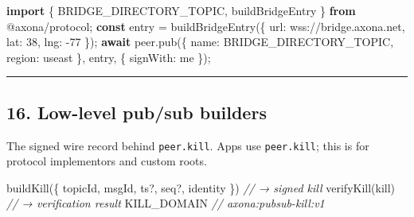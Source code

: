 \documentclass[
  nobib]{tufte-handout}
\newenvironment{Shaded}{}{}
\newcommand{\CommentTok}[1]{\textcolor[rgb]{0.38,0.63,0.69}{\textit{#1}}}
\newcommand{\ControlFlowTok}[1]{\textcolor[rgb]{0.00,0.44,0.13}{\textbf{#1}}}
\newcommand{\DataTypeTok}[1]{\textcolor[rgb]{0.56,0.13,0.00}{#1}}
\newcommand{\DecValTok}[1]{\textcolor[rgb]{0.25,0.63,0.44}{#1}}
\newcommand{\FunctionTok}[1]{\textcolor[rgb]{0.02,0.16,0.49}{#1}}
\newcommand{\ImportTok}[1]{\textcolor[rgb]{0.00,0.50,0.00}{\textbf{#1}}}
\newcommand{\KeywordTok}[1]{\textcolor[rgb]{0.00,0.44,0.13}{\textbf{#1}}}
\newcommand{\NormalTok}[1]{#1}
\newcommand{\OperatorTok}[1]{\textcolor[rgb]{0.40,0.40,0.40}{#1}}
\newcommand{\StringTok}[1]{\textcolor[rgb]{0.25,0.44,0.63}{#1}}
\begin{document}
\begin{Shaded}
\begin{Highlighting}[]
\ImportTok{import}\NormalTok{ \{ BRIDGE\_DIRECTORY\_TOPIC}\OperatorTok{,}\NormalTok{ buildBridgeEntry \} }\ImportTok{from} \StringTok{\textquotesingle{}@axona/protocol\textquotesingle{}}\OperatorTok{;}
\KeywordTok{const}\NormalTok{ entry }\OperatorTok{=} \FunctionTok{buildBridgeEntry}\NormalTok{(\{ }\DataTypeTok{url}\OperatorTok{:} \StringTok{\textquotesingle{}wss://bridge.axona.net\textquotesingle{}}\OperatorTok{,} \DataTypeTok{lat}\OperatorTok{:} \DecValTok{38}\OperatorTok{,} \DataTypeTok{lng}\OperatorTok{:} \OperatorTok{{-}}\DecValTok{77}\NormalTok{ \})}\OperatorTok{;}
\ControlFlowTok{await}\NormalTok{ peer}\OperatorTok{.}\FunctionTok{pub}\NormalTok{(\{ }\DataTypeTok{name}\OperatorTok{:}\NormalTok{ BRIDGE\_DIRECTORY\_TOPIC}\OperatorTok{,} \DataTypeTok{region}\OperatorTok{:} \StringTok{\textquotesingle{}useast\textquotesingle{}}\NormalTok{ \}}\OperatorTok{,}\NormalTok{ entry}\OperatorTok{,}\NormalTok{ \{ }\DataTypeTok{signWith}\OperatorTok{:}\NormalTok{ me \})}\OperatorTok{;}
\end{Highlighting}
\end{Shaded}

\begin{center}\rule{0.5\linewidth}{0.5pt}\end{center}

\subsection{16. Low-level pub/sub
builders}\label{low-level-pubsub-builders}

The signed wire record behind \texttt{peer.kill}. Apps use
\texttt{peer.kill}; this is for protocol implementors and custom roots.

\begin{Shaded}
\begin{Highlighting}[]
\FunctionTok{buildKill}\NormalTok{(\{ topicId}\OperatorTok{,}\NormalTok{ msgId}\OperatorTok{,}\NormalTok{ ts}\OperatorTok{?,}\NormalTok{ seq}\OperatorTok{?,}\NormalTok{ identity \})                       }\CommentTok{// → signed kill}
\FunctionTok{verifyKill}\NormalTok{(kill)                                                          }\CommentTok{// → verification result}
\NormalTok{KILL\_DOMAIN     }\CommentTok{// \textquotesingle{}axona:pubsub{-}kill:v1\textquotesingle{}}
\end{Highlighting}
\end{Shaded}
\end{document}
